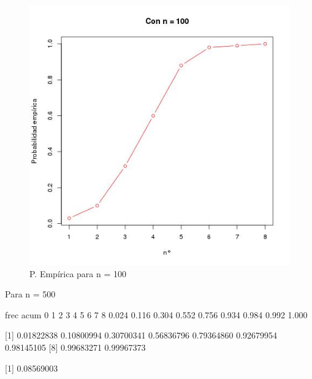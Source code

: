 \documentclass[letter,10pt]{article}
\begin{document}
\begin{itemize}
\begin{minipage}{\linewidth}
\begin{minipage}{0.45\linewidth}
\begin{figure}[H]
              \includegraphics[width=\linewidth]{p3_emp_100.jpg}
              \caption{P. Emp\'irica para n = 100}
          \end{figure}
      \end{minipage}
  \end{minipage}


Para n = 500

frec acum
    0     1     2     3     4     5     6     7     8 
0.024 0.116 0.304 0.552 0.756 0.934 0.984 0.992 1.000


[1] 0.01822838 0.10800994 0.30700341 0.56836796 0.79364860 0.92679954 0.98145105
[8] 0.99683271 0.99967373

[1] 0.08569003



\end{itemize}
\end{document}

